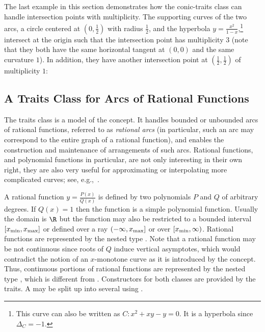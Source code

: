 
The last example in this section demonstrates how the conic-traits
class can handle intersection points with multiplicity. The
supporting curves of the two arcs, a circle centered at
$(0,\frac{1}{2})$ with radius $\frac{1}{2}$, and the hyperbola $y
= \frac{x^2}{1-x}$,\footnote{This curve can also be written as $C:
x^2 + xy - y = 0$. It is a hyperbola since $\Delta_{C} = -1$.}
intersect at the origin such that the intersection point has
multiplicity $3$ (note that they both have the same horizontal
tangent at $(0,0)$ and the same curvature $1$). In addition, they
have another intersection point at $(\frac{1}{2},\frac{1}{2})$ of
multiplicity $1$:


\subsection{A Traits Class for Arcs of Rational Functions\label{arr_ssec:tr_ratfunc}}

The traits class   
is a model of the 
concept. It handles bounded or unbounded arcs of rational functions,
referred to as {\sl rational arcs} (in particular, such an arc may
correspond to the entire graph of a rational function), and enables the
construction and maintenance of arrangements of such arcs. 
Rational functions, and polynomial functions in particular, are
not only interesting in their own right, they are also very useful
for approximating or interpolating more complicated curves; see,
e.g.,~\cite[Chapter~3]{cgal:ptvf-nrcpp-02}.

A rational function $y = \frac{P(x)}{Q(x)}$ is defined by two
polynomials $P$ and $Q$ of arbitrary degrees.  If $Q(x) = 1$ then
the function is a simple polynomial function. Usually the domain is
$\R$ but the function may also be restricted to a bounded interval
$[x_{\rm min}, x_{\rm max}]$ or defined over a ray
$(-\infty, x_{\rm max}]$ or over $[x_{\rm min}, \infty)$. Rational
functions are represented by the nested type . Note
that a rational function may be not continuous since roots of $Q$
induce vertical asymptotes, which would contradict the notion of an
$x$-monotone curve as it is introduced by the 
concept. Thus, continuous portions of rational functions are
represented by the nested type , which is
different from . Constructors for both classes are
provided by the traits. A  may be split up into several
 using . 

